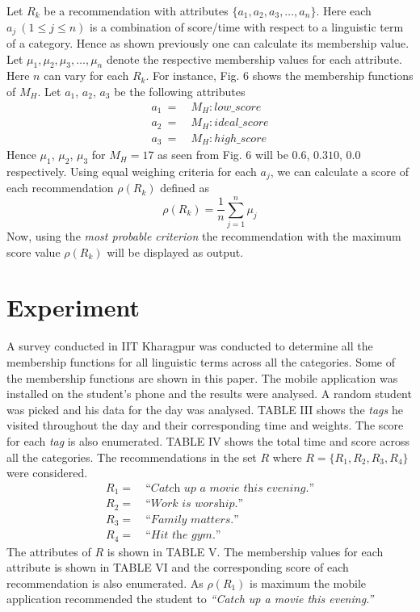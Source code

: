 \documentclass[conference]{IEEEtran}
\newcommand{\quotes}[1]{``#1''}
\begin{document}
Let $R_k$ be a recommendation with attributes $\{a_1, a_2, a_3, \ldots, a_n\}$. Here each $a_j\ (1 \leq j \leq n)$ is a combination of score/time with respect to a linguistic term of a category. Hence as shown previously one can calculate its membership value. Let $\mu_1, \mu_2, \mu_3, \ldots, \mu_n$ denote the respective membership values for each attribute. Here $n$ can vary for each $R_k$.  For instance, Fig. 6 shows the membership functions of $M_H$. Let $a_1$, $a_2$, $a_3$ be the following attributes
\begin{align*}
a_1\ =&\ M_H:low\_score\\
a_2\ =&\ M_H:ideal\_score\\
a_3\ =&\ M_H:high\_score
\end{align*}
Hence $\mu_1$, $\mu_2$, $\mu_3$ for $M_H=17$ as seen from Fig. 6 will be $0.6$, $0.310$, $0.0$ respectively. Using equal weighing criteria for each $a_j$, we can calculate a score of each recommendation $\rho(R_k)$ defined as
$$\rho(R_k) = \frac{1}{n}\sum_{j=1}^{n} \mu_j$$
Now, using the \textit{most probable criterion} the recommendation with the maximum score value $\rho(R_k)$ will be displayed as output.

\section{Experiment}
A survey conducted in IIT Kharagpur was conducted to determine all the membership functions for all linguistic terms across all the categories. Some of the membership functions are shown in this paper. The mobile application was installed on the student\rq s phone and the results were analysed. A random student was picked and his data for the day was analysed. TABLE III shows the \textit{tags} he visited throughout the day and their corresponding time and weights. The score for each \textit{tag} is also enumerated. TABLE IV shows the total time and score across all the categories. The recommendations in the set $R$ where $R = \{R_1, R_2, R_3, R_4\}$ were considered.
\begin{align*}
R_1 =\ &\textit{\quotes{Catch up a movie this evening.}}\\
R_2 =\ &\textit{\quotes{Work is worship.}}\\
R_3 =\ &\textit{\quotes{Family matters.}}\\
R_4 =\ &\textit{\quotes{Hit the gym.}}
\end{align*}
The attributes of $R$ is shown in TABLE V. The membership values for each attribute is shown in TABLE VI and the corresponding score of each recommendation is also enumerated. As $\rho(R_1)$ is maximum the mobile application recommended the student to \textit{\quotes{Catch up a movie this evening.}}
\end{document}
